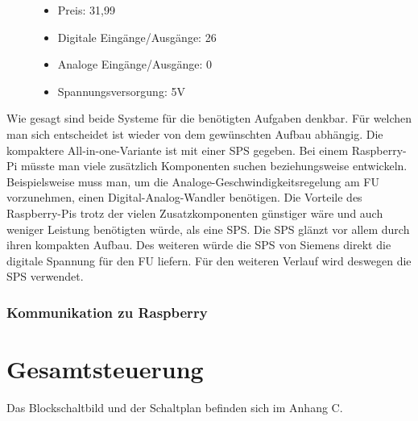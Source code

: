 \begin{figure}[H]
\begin{minipage}[t]{0.45\textwidth}
\begin{itemize}
	\item{Preis: 31,99\textsf{\texteuro}}
	\item{Digitale Eingänge/Ausgänge: 26}
	\item{Analoge Eingänge/Ausgänge: 0}
	\item{Spannungsversorgung: 5V}
\end{itemize}
\end{minipage}
\end{figure}

Wie gesagt sind beide Systeme für die benötigten Aufgaben denkbar. Für welchen man sich entscheidet ist wieder von dem gewünschten Aufbau abhängig. Die kompaktere All-in-one-Variante ist mit einer SPS gegeben. Bei einem Raspberry-Pi müsste man viele zusätzlich Komponenten suchen beziehungsweise entwickeln. Beispielsweise muss man, um die Analoge-Geschwindigkeitsregelung am \ac{FU} vorzunehmen, einen Digital-Analog-Wandler benötigen. Die Vorteile des Raspberry-Pis trotz der vielen Zusatzkomponenten günstiger wäre und auch weniger Leistung benötigten würde, als eine SPS. Die SPS glänzt vor allem durch ihren kompakten Aufbau. Des weiteren würde die SPS von Siemens direkt die digitale Spannung für den \ac{FU} liefern. Für den weiteren Verlauf wird deswegen die SPS verwendet. 

\subsubsection{Kommunikation zu Raspberry}
\label{sec:kommunikationZuRaspberry}



\newpage

\section{Gesamtsteuerung}
\label{sec:gesamtsteuerung}

Das Blockschaltbild und der Schaltplan befinden sich im Anhang C.

